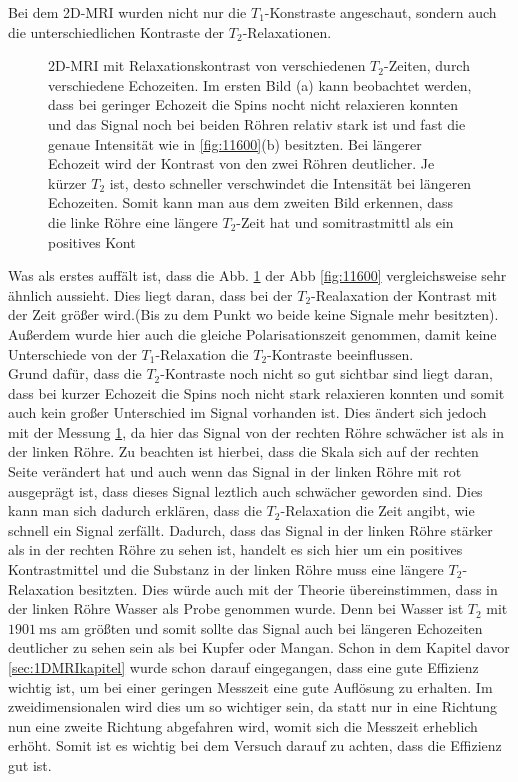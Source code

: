 Bei dem 2D-MRI wurden nicht nur die $T_1$-Konstraste angeschaut, sondern auch die unterschiedlichen Kontraste der $T_2$-Relaxationen. 

    \begin{figure}[H]
        \centering
        {}
        {}
        \caption[2D-MRI mit Relaxationskontrast von verschiedenen $T_2$-Zeiten, durch verschiedene Echozeiten]{2D-MRI mit Relaxationskontrast von verschiedenen $T_2$-Zeiten, durch verschiedene Echozeiten. Im ersten Bild (a) kann beobachtet werden, dass bei geringer Echozeit die Spins nocht nicht relaxieren konnten und das Signal noch bei beiden Röhren relativ stark ist und fast die genaue Intensität wie in \ref{fig:11600}(b) besitzten. Bei längerer Echozeit wird der Kontrast von den zwei Röhren deutlicher. Je kürzer $T_2$ ist, desto schneller verschwindet die Intensität bei längeren Echozeiten. Somit kann man aus dem zweiten Bild erkennen, dass die linke Röhre eine längere $T_2$-Zeit hat und somitrastmittl als ein positives Kont}\label{fig:1250}
    \end{figure}
Was als erstes auffält ist, dass die Abb. \ref{fig:1250} der Abb \ref{fig:11600}  vergleichsweise sehr ähnlich aussieht. Dies liegt daran, dass bei der $T_2$-Realaxation der Kontrast mit der Zeit größer wird.(Bis zu dem Punkt wo beide keine Signale mehr besitzten). Außerdem wurde hier auch die gleiche Polarisationszeit genommen, damit keine Unterschiede von der $T_1$-Relaxation die $T_2$-Kontraste beeinflussen. \\
Grund dafür, dass die $T_2$-Kontraste noch nicht so gut sichtbar sind liegt daran, dass bei kurzer Echozeit die Spins noch nicht stark relaxieren konnten und somit auch kein großer Unterschied im Signal vorhanden ist. Dies ändert sich jedoch mit der Messung \ref{fig:1250}, da hier das Signal von der rechten Röhre schwächer ist als in der linken Röhre. Zu beachten ist hierbei, dass die Skala sich auf der rechten Seite verändert hat und auch wenn das Signal in der linken Röhre mit rot ausgeprägt ist, dass dieses Signal leztlich auch schwächer geworden sind. Dies kann man sich dadurch erklären, dass die $T_2$-Relaxation die Zeit angibt, wie schnell ein Signal zerfällt. Dadurch, dass das Signal in der linken Röhre stärker als in der rechten Röhre zu sehen ist, handelt es sich hier um ein positives Kontrastmittel und die Substanz in der linken Röhre muss eine längere $T_2$-Relaxation besitzten.  
Dies würde auch mit der Theorie übereinstimmen, dass in der linken Röhre Wasser als Probe genommen wurde. Denn bei Wasser ist $T_2$ mit  $\SI{1901}{\milli\second}$ am größten und somit sollte das Signal auch bei längeren Echozeiten deutlicher zu sehen sein als bei Kupfer oder Mangan.
Schon in dem Kapitel davor \ref{sec:1DMRIkapitel} wurde schon darauf eingegangen, dass eine gute Effizienz wichtig ist, um bei einer geringen Messzeit eine gute Auflösung zu erhalten. Im zweidimensionalen wird dies um so wichtiger sein, da statt nur in eine Richtung nun eine zweite Richtung abgefahren wird, womit sich die Messzeit erheblich erhöht. Somit ist es wichtig bei dem Versuch darauf zu achten, dass die Effizienz gut ist.